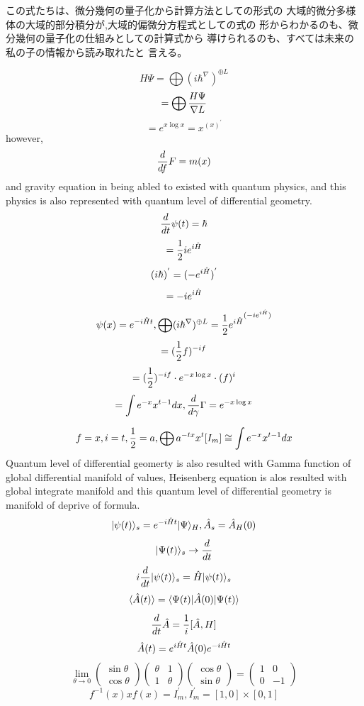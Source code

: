 \documentclass{jsarticle}
\begin{document}
    この式たちは、微分幾何の量子化から計算方法としての形式の
    大域的微分多様体の大域的部分積分が,大域的偏微分方程式としての式の
    形からわかるのも、微分幾何の量子化の仕組みとしての計算式から
    導けられるのも、すべては未来の私の子の情報から読み取れたと
    言える。
 
    $$ H \Psi = \bigoplus (i \hbar ^{\nabla})^{\oplus L} $$
    $$ = \bigoplus {{ H \Psi} \over \nabla L} $$
    $$ = e^{x \log x} = x^{(x)^{'}} $$
    however,
    $$ {d \over df}F = m(x) $$
    and gravity equation in being abled to existed with quantum physics,
    and this physics is also represented with quantum level of differential
    geometry.
    $$ {d \over dt}\psi(t) = \hbar $$
    $$ = {1 \over 2}i e^{i \Hat{H}} $$
    $$ (i \hbar)^{'} = (- e^{i \Hat{H}})^{'} $$
    $$ = - i e^{i \Hat{H}} $$
    $$ \psi(x) = e^{-i \Hat{H}t}, \bigoplus (i \hbar ^{\nabla})^{\oplus L} 
    = {{{1 \over 2} e^{i \Hat{H}}}^{(-i e^{i \Hat{H}})}} $$
    $$ = ({1 \over 2}f)^{-i f}$$
    $$ = ({1 \over 2})^{-i f} \cdot e^{-x \log x} \cdot (f)^{i} $$
    $$ = \int e^{- x} x^{t - 1}dx, {d \over d \gamma}\Gamma = e^{-x \log x}  $$
     
    $$ f = x, i = t, {1 \over 2} = a, \bigoplus a^{-t x}x^t [I_m]
     \cong \int e^{-x} x^{t - 1}dx $$
     Quantum level of differential geomerty is also resulted with
    Gamma function of global differential manifold of values, Heisenberg
    equation is alos resulted with global integrate manifold and this
    quantum level of differential geometry is manifold of deprive of formula.
    $$ |\psi(t)\rangle_s = e^{-i\Hat{H} t}|\Psi\rangle_{H},
    \Hat{A}_s = \Hat{A}_H(0) $$
    $$ |\Psi(t)\rangle_s \to {d \over dt} $$
    $$ i {d \over dt}|\psi (t) \rangle_s = \Hat{H}|\psi(t)\rangle_s $$
    $$ \langle\Hat{A}(t)\rangle = \langle\Psi(t)|\Hat{A}(0)|\Psi(t)\rangle  $$
    $$ {d \over dt}\Hat{A} = {1 \over i}[\Hat{A},H] $$
    $$ \Hat{A}(t) = e^{i\Hat{H}t}\Hat{A}(0)e^{-i\Hat{H}t} $$
    $$ \lim_{\theta \to 0} \begin{pmatrix} \sin \theta \\
    \cos \theta \end{pmatrix} \begin{pmatrix} \theta & 1 \\
    1 & \theta \end{pmatrix} \begin{pmatrix} \cos \theta \\
    \sin \theta \end{pmatrix} = \begin{pmatrix} 1 & 0 \\
    0 & - 1 \end{pmatrix} $$
    $$ f^{-1}(x) x f(x) = I^{'}_m, I^{'}_m = [1,0] \times [0,1] $$
\end{document}
